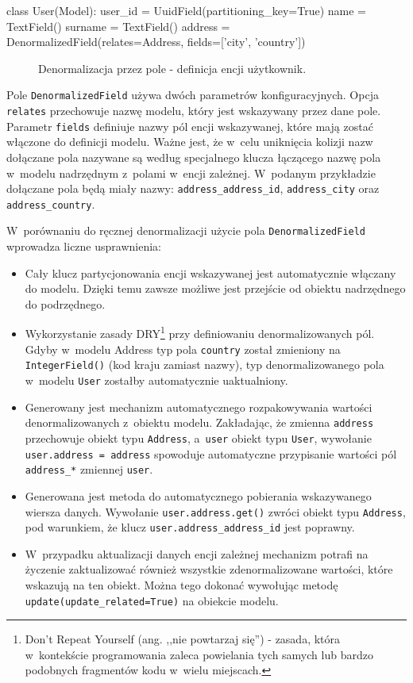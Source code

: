 \begin{verbbox}
class User(Model):
    user_id = UuidField(partitioning_key=True)
    name = TextField()
    surname = TextField()
    address = DenormalizedField(relates=Address, 
                                fields=['city', 'country'])
\end{verbbox}

\begin{figure}[ht!]
	\centering
	\theverbbox
	\caption{Denormalizacja przez pole - definicja encji użytkownik.}
	\label{lst:denormalization_by_field_example}
\end{figure}

Pole \verb+DenormalizedField+ używa dwóch parametrów konfiguracyjnych. Opcja \verb+relates+ przechowuje nazwę modelu, który jest wskazywany przez dane pole. Parametr \verb+fields+ definiuje nazwy pól encji wskazywanej, które mają zostać włączone do definicji modelu. Ważne jest, że w~celu uniknięcia kolizji nazw dołączane pola nazywane są według specjalnego klucza łączącego nazwę pola w~modelu nadrzędnym z~polami w~encji zależnej. W~podanym przykładzie dołączane pola będą miały nazwy: \verb+address_address_id+, \verb+address_city+ oraz \verb+address_country+.

W~porównaniu do ręcznej denormalizacji użycie pola \verb+DenormalizedField+ wprowadza liczne usprawnienia:

\begin{itemize}
	\item Cały klucz partycjonowania encji wskazywanej jest automatycznie włączany do modelu. Dzięki temu zawsze możliwe jest przejście od obiektu nadrzędnego do podrzędnego.
	\item Wykorzystanie zasady DRY\footnote{Don't Repeat Yourself (ang. ,,nie powtarzaj się'') - zasada, która w~kontekście programowania zaleca powielania tych samych lub bardzo podobnych fragmentów kodu w~wielu miejscach.} przy definiowaniu denormalizowanych pól. Gdyby w~modelu Address typ pola \verb+country+ został zmieniony na \verb+IntegerField()+ (kod kraju zamiast nazwy), typ denormalizowanego pola w~modelu \verb+User+ zostałby automatycznie uaktualniony.
	\item Generowany jest mechanizm automatycznego rozpakowywania wartości denormalizowanych z~obiektu modelu. Zakładając, że zmienna \verb+address+ przechowuje obiekt typu \verb+Address+, a~\verb+user+ obiekt typu \verb+User+, wywołanie \verb+user.address = address+ spowoduje automatyczne przypisanie wartości pól \verb+address_*+ zmiennej \verb+user+.
	\item Generowana jest metoda do automatycznego pobierania wskazywanego wiersza danych. Wywołanie \verb+user.address.get()+ zwróci obiekt typu \verb+Address+, pod warunkiem, że klucz \verb+user.address_address_id+ jest poprawny.
	\item W~przypadku aktualizacji danych encji zależnej mechanizm potrafi na życzenie zaktualizować również wszystkie zdenormalizowane wartości, które wskazują na ten obiekt. Można tego dokonać wywołując metodę \verb+update(update_related=True)+ na obiekcie modelu.
\end{itemize}

